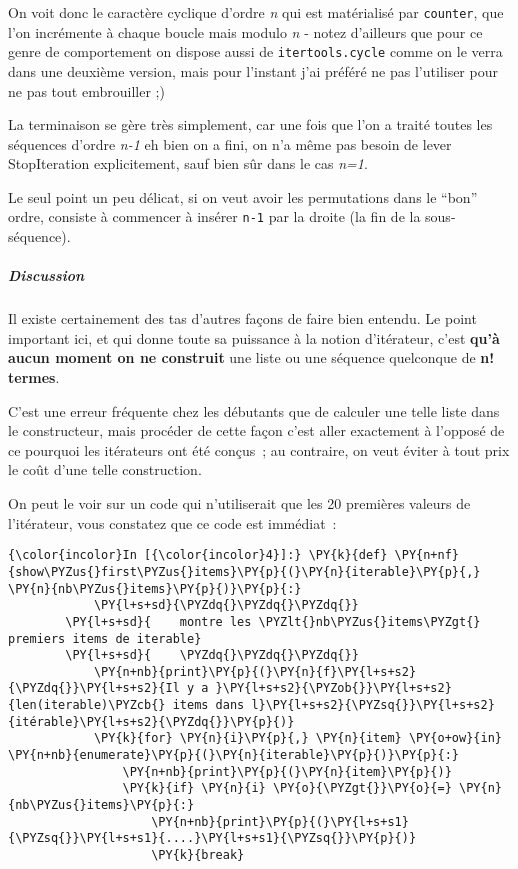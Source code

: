     On voit donc le caractère cyclique d'ordre \emph{n} qui est matérialisé
par \texttt{counter}, que l'on incrémente à chaque boucle mais modulo
\emph{n} - notez d'ailleurs que pour ce genre de comportement on dispose
aussi de \texttt{itertools.cycle} comme on le verra dans une deuxième
version, mais pour l'instant j'ai préféré ne pas l'utiliser pour ne pas
tout embrouiller ;)

La terminaison se gère très simplement, car une fois que l'on a traité
toutes les séquences d'ordre \emph{n-1} eh bien on a fini, on n'a même
pas besoin de lever StopIteration explicitement, sauf bien sûr dans le
cas \emph{n=1}.

Le seul point un peu délicat, si on veut avoir les permutations dans le
``bon'' ordre, consiste à commencer à insérer \texttt{n-1} par la droite
(la fin de la sous-séquence).

    \hypertarget{discussion}{%
\subparagraph{Discussion}\label{discussion}}

    Il existe certainement des tas d'autres façons de faire bien entendu. Le
point important ici, et qui donne toute sa puissance à la notion
d'itérateur, c'est \textbf{qu'à aucun moment on ne construit} une liste
ou une séquence quelconque de \textbf{n! termes}.

C'est une erreur fréquente chez les débutants que de calculer une telle
liste dans le constructeur, mais procéder de cette façon c'est aller
exactement à l'opposé de ce pourquoi les itérateurs ont été conçus~; au
contraire, on veut éviter à tout prix le coût d'une telle construction.

On peut le voir sur un code qui n'utiliserait que les 20 premières
valeurs de l'itérateur, vous constatez que ce code est immédiat~:

    \begin{Verbatim}[commandchars=\\\{\}]
{\color{incolor}In [{\color{incolor}4}]:} \PY{k}{def} \PY{n+nf}{show\PYZus{}first\PYZus{}items}\PY{p}{(}\PY{n}{iterable}\PY{p}{,} \PY{n}{nb\PYZus{}items}\PY{p}{)}\PY{p}{:}
            \PY{l+s+sd}{\PYZdq{}\PYZdq{}\PYZdq{}}
        \PY{l+s+sd}{    montre les \PYZlt{}nb\PYZus{}items\PYZgt{} premiers items de iterable}
        \PY{l+s+sd}{    \PYZdq{}\PYZdq{}\PYZdq{}}
            \PY{n+nb}{print}\PY{p}{(}\PY{n}{f}\PY{l+s+s2}{\PYZdq{}}\PY{l+s+s2}{Il y a }\PY{l+s+s2}{\PYZob{}}\PY{l+s+s2}{len(iterable)\PYZcb{} items dans l}\PY{l+s+s2}{\PYZsq{}}\PY{l+s+s2}{itérable}\PY{l+s+s2}{\PYZdq{}}\PY{p}{)}
            \PY{k}{for} \PY{n}{i}\PY{p}{,} \PY{n}{item} \PY{o+ow}{in} \PY{n+nb}{enumerate}\PY{p}{(}\PY{n}{iterable}\PY{p}{)}\PY{p}{:}
                \PY{n+nb}{print}\PY{p}{(}\PY{n}{item}\PY{p}{)}
                \PY{k}{if} \PY{n}{i} \PY{o}{\PYZgt{}}\PY{o}{=} \PY{n}{nb\PYZus{}items}\PY{p}{:}
                    \PY{n+nb}{print}\PY{p}{(}\PY{l+s+s1}{\PYZsq{}}\PY{l+s+s1}{....}\PY{l+s+s1}{\PYZsq{}}\PY{p}{)}
                    \PY{k}{break}
\end{Verbatim}


